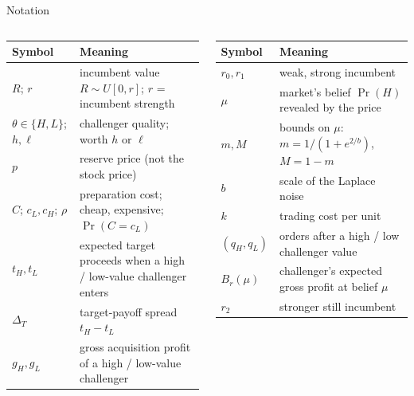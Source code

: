 \documentclass[10pt,aspectratio=169]{beamer}
\newcommand{\NavGap}{\par\vspace{0.45cm}}%
\let\AdapterBackButton\BackButton
\renewcommand{\BackButton}[1]{\NavGap\AdapterBackButton{#1}}%
\begin{document}
\begin{frame}[label=A12]{Notation}
\hypertarget{app:notation}{}
\vspace{4pt}
{\footnotesize
\begin{columns}[T]
\begin{tabular}{@{}l>{\raggedright\arraybackslash}p{4.6cm}@{}}
\toprule
Symbol & Meaning\\
\midrule
$R$; $r$ & incumbent value $R\sim U[0,r]$; $r$ = incumbent strength\\
$\theta\in\{H,L\}$; $h,\ell$ & challenger quality; worth $h$ or $\ell$\\
$p$ & reserve price (not the stock price)\\
$C$; $c_L,c_H$; $\rho$ & preparation cost; cheap, expensive; $\Pr(C=c_L)$\\
$t_H,t_L$ & expected target proceeds when a high / low-value challenger enters\\
$\Delta_T$ & target-payoff spread $t_H-t_L$\\
$g_H,g_L$ & gross acquisition profit of a high / low-value challenger\\
\bottomrule
\end{tabular}
\begin{tabular}{@{}l>{\raggedright\arraybackslash}p{4.6cm}@{}}
\toprule
Symbol & Meaning\\
\midrule
$r_0,r_1$ & weak, strong incumbent\\
$\mu$ & market's belief $\Pr(H)$ revealed by the price\\
$m,M$ & bounds on $\mu$: $m=1/(1+e^{2/b})$, $M=1-m$\\
$b$ & scale of the Laplace noise\\
$k$ & trading cost per unit\\
$(q_H,q_L)$ & orders after a high / low challenger value\\
$B_r(\mu)$ & challenger's expected gross profit at belief $\mu$\\
$r_2$ & stronger still incumbent\\
\bottomrule
\end{tabular}
\end{columns}}
\end{frame}
\end{document}
